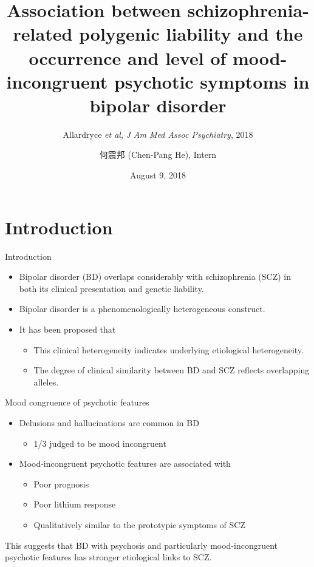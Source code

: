 \documentclass{beamer}
\title[(Allardyce \textit{et al}, 2018)]{Association between schizophrenia-related polygenic liability and the occurrence and level of mood-incongruent psychotic symptoms in bipolar disorder}
\subtitle{Allardryce \textit{et al}, \textit{J Am Med Assoc Psychiatry}, 2018}
\author[Chen-Pang He]{何震邦 (Chen-Pang He), Intern}
\date{August 9, 2018}
\institute[CGH]{Cathay General Hospital}
\begin{document}
\maketitle

\section{Introduction}
\begin{frame}{Introduction}
    \begin{itemize}
        \item Bipolar disorder (BD) overlaps considerably with schizophrenia
              (SCZ) in both its clinical presentation and genetic liability.
        \item Bipolar disorder is a phenomenologically heterogeneous construct.
        \item It has been proposed that
            \begin{itemize}
                \item This clinical heterogeneity indicates underlying etiological heterogeneity.
                \item The degree of clinical similarity between BD and SCZ reflects overlapping alleles.
            \end{itemize}
    \end{itemize}
\end{frame}

\begin{frame}{Mood congruence of psychotic features}
    \begin{itemize}
        \item Delusions and hallucinations are common in BD
            \begin{itemize}
                \item 1/3 judged to be mood incongruent
            \end{itemize}
        \item Mood-incongruent psychotic features are associated with
            \begin{itemize}
                \item Poor prognosis
                \item Poor lithium response
                \item Qualitatively similar to the prototypic symptoms of SCZ
            \end{itemize}
    \end{itemize}

    This suggests that BD with psychosis and particularly mood-incongruent
    psychotic features has stronger etiological links to SCZ.
\end{frame}
\end{document}
